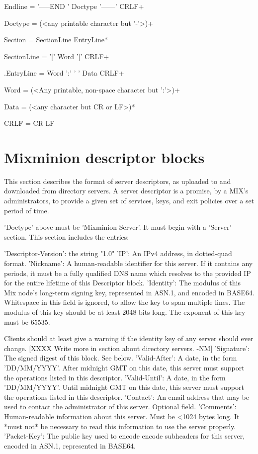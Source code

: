 Endline = '-----END ' Doctype '------' CRLF+

Doctype = (<any printable character but '-'>)+

Section = SectionLine EntryLine*

SectionLine = '[' Word ']' CRLF+

.EntryLine = Word ':' ' ' Data CRLF+

Word = (<Any printable, non-space character but ':'>)+

Data = (<any character but CR or LF>)*

CRLF = CR LF

\section{Mixminion descriptor blocks}

This section describes the format of server descriptors, as uploaded
to and downloaded from directory servers.  A server descriptor is a
promise, by a MIX's administrators, to provide a given set of
services, keys, and exit policies over a set period of time.

'Doctype' above must be 'Mixminion Server'.  It must begin with a
'Server' section.  This section includes the entries:

     'Descriptor-Version':  the string "1.0"
     'IP': An IPv4 address, in dotted-quad format.
     'Nickname': A human-readable identifier for this server.  If it
         contains any periods, it must be a fully qualified DNS name
         which resolves to the provided IP for the entire lifetime of
         this Descriptor block.
     'Identity': The modulus of this Mix node's long-term signing key,
         represented in ASN.1, and encoded in BASE64.  Whitespace in
         this field is ignored, to allow the key to span multiple
         lines.  The modulus of this key should be at least 2048 bits
         long.  The exponent of this key must be 65535.

	 Clients should at least give a warning if the identity key of
         any server should ever change. [XXXX Write more in section
         about directory servers. -NM]
     'Signature': The signed digest of this block.  See below.
     'Valid-After': A date, in the form 'DD/MM/YYYY'.  After midnight GMT
         on this date, this server must support the operations listed
         in this descriptor.
     'Valid-Until': A date, in the form 'DD/MM/YYYY'.  Until midnight
         GMT on this date, this server must support the operations listed
         in this descriptor.
     'Contact': An email address that may be used to contact the
         administrator of this server. Optional field.
     'Comments': Human-readable information about this server.  Must
         be <1024 bytes long.  It *must not* be necessary to read this
         information to use the server properly.
     'Packet-Key': The public key used to encode encode subheaders for
         this server, encoded in ASN.1, represented in BASE64. 

